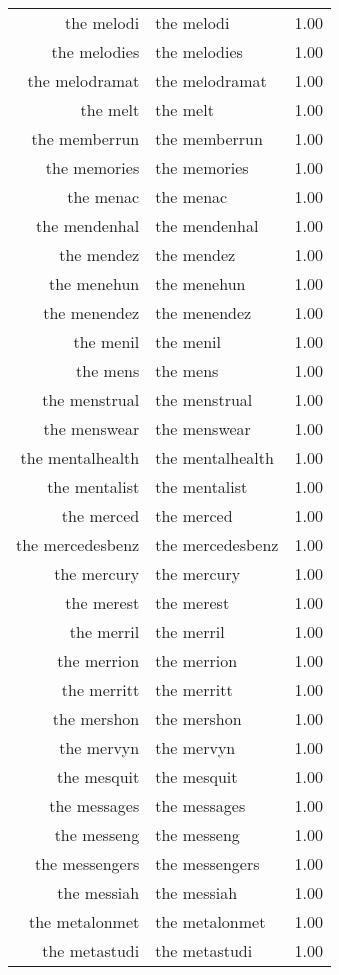 \begin{table}[ht]
\begin{tabular}{rlr}
  the melodi & the melodi & 1.00 \\ 
  the melodies & the melodies & 1.00 \\ 
  the melodramat & the melodramat & 1.00 \\ 
  the melt & the melt & 1.00 \\ 
  the memberrun & the memberrun & 1.00 \\ 
  the memories & the memories & 1.00 \\ 
  the menac & the menac & 1.00 \\ 
  the mendenhal & the mendenhal & 1.00 \\ 
  the mendez & the mendez & 1.00 \\ 
  the menehun & the menehun & 1.00 \\ 
  the menendez & the menendez & 1.00 \\ 
  the menil & the menil & 1.00 \\ 
  the mens & the mens & 1.00 \\ 
  the menstrual & the menstrual & 1.00 \\ 
  the menswear & the menswear & 1.00 \\ 
  the mentalhealth & the mentalhealth & 1.00 \\ 
  the mentalist & the mentalist & 1.00 \\ 
  the merced & the merced & 1.00 \\ 
  the mercedesbenz & the mercedesbenz & 1.00 \\ 
  the mercury & the mercury & 1.00 \\ 
  the merest & the merest & 1.00 \\ 
  the merril & the merril & 1.00 \\ 
  the merrion & the merrion & 1.00 \\ 
  the merritt & the merritt & 1.00 \\ 
  the mershon & the mershon & 1.00 \\ 
  the mervyn & the mervyn & 1.00 \\ 
  the mesquit & the mesquit & 1.00 \\ 
  the messages & the messages & 1.00 \\ 
  the messeng & the messeng & 1.00 \\ 
  the messengers & the messengers & 1.00 \\ 
  the messiah & the messiah & 1.00 \\ 
  the metalonmet & the metalonmet & 1.00 \\ 
  the metastudi & the metastudi & 1.00 \\ 

\end{tabular}
\end{table}
